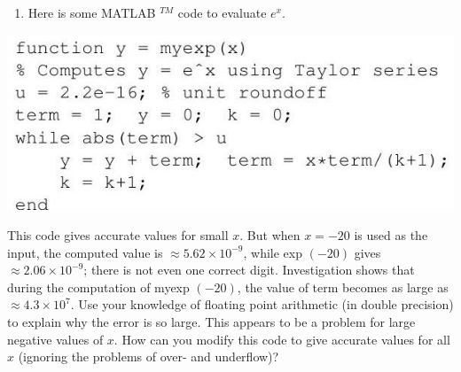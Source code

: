 \documentclass[10pt]{article}
\begin{document}
\begin{enumerate}
  \item Here is some MATLAB ${ }^{T M}$ code to evaluate $e^{x}$.
\end{enumerate}
\includegraphics[max width=\textwidth]{2022_05_24_68a702cbf9a84fb58e04g-06}

This code gives accurate values for small $x$. But when $x=-20$ is used as the input, the computed value is $\approx 5.62 \times 10^{-9}$, while exp $(-20)$ gives $\approx 2.06 \times 10^{-9}$; there is not even one correct digit. Investigation shows that during the computation of myexp $(-20)$, the value of term becomes as large as $\approx 4.3 \times 10^{7}$. Use your knowledge of floating point arithmetic (in double precision) to explain why the error is so large. This appears to be a problem for large negative values of $x$. How can you modify this code to give accurate values for all $x$ (ignoring the problems of over- and underflow)?
\end{document}
